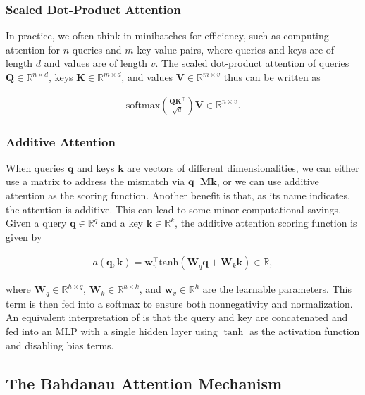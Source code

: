 \documentclass[a4paper,12pt]{article}
\theoremstyle{definition}
\begin{document}
\subsubsection*{Scaled Dot-Product Attention}
In practice, we often think in minibatches for efficiency, such as computing attention for $n$ queries and $m$ key-value pairs, where queries and keys are of length $d$
and values are of length $v$. The scaled dot-product attention of queries $\mathbf Q\in\mathbb R^{n\times d}$, keys $\mathbf K\in\mathbb R^{m\times d}$,
and values $\mathbf V\in\mathbb R^{m\times v}$ thus can be written as

\begin{align*}
    \mathrm{softmax}\left(\frac{\mathbf Q \mathbf K^\top }{\sqrt{d}}\right) \mathbf V \in \mathbb{R}^{n\times v}.
\end{align*}

\subsubsection*{Additive Attention}
When queries $\mathbf{q}$ and keys $\mathbf{k}$ are vectors of different dimensionalities, we can either use a matrix to address the mismatch via $\mathbf{q}^\top \mathbf{M} \mathbf{k}$,
or we can use additive attention as the scoring function. Another benefit is that, as its name indicates, the attention is additive. This can lead to some minor computational savings.
Given a query $\mathbf{q} \in \mathbb{R}^q$ and a key $\mathbf{k} \in \mathbb{R}^k$, the additive attention scoring function is given by

\begin{align*}
    a(\mathbf q, \mathbf k) = \mathbf w_v^\top \text{tanh}(\mathbf W_q\mathbf q + \mathbf W_k \mathbf k) \in \mathbb{R},
\end{align*}

where $\mathbf W_q\in\mathbb R^{h\times q}$, $\mathbf W_k\in\mathbb R^{h\times k}$, and $\mathbf w_v\in\mathbb R^{h}$ are the learnable parameters.
This term is then fed into a softmax to ensure both nonnegativity and normalization. An equivalent interpretation of is that the query and key are
concatenated and fed into an MLP with a single hidden layer using $\tanh$ as the activation function and disabling bias terms.

\subsection*{The Bahdanau Attention Mechanism}
\end{document}
